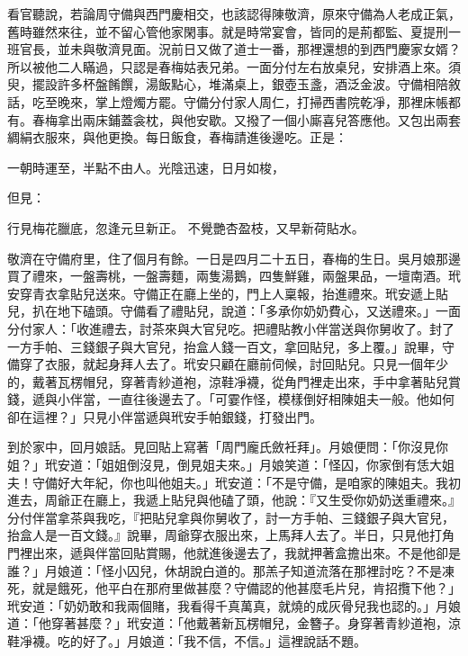 看官聽說，若論周守備與西門慶相交，也該認得陳敬濟，原來守備為人老成正氣，舊時雖然來往，並不留心管他家閑事。就是時常宴會，皆同的是荊都監、夏提刑一班官長，並未與敬濟見面。況前日又做了道士一番，那裡還想的到西門慶家女婿？所以被他二人瞞過，只認是春梅姑表兄弟。一面分付左右放桌兒，安排酒上來。須臾，擺設許多杯盤餚饌，湯飯點心，堆滿桌上，銀壺玉盞，酒泛金波。守備相陪敘話，吃至晚來，掌上燈燭方罷。守備分付家人周仁，打掃西書院乾凈，那裡床帳都有。春梅拿出兩床鋪蓋衾枕，與他安歇。又撥了一個小廝喜兒答應他。又包出兩套綢絹衣服來，與他更換。每日飯食，春梅請進後邊吃。正是：

一朝時運至，半點不由人。光陰迅速，日月如梭，

但見：

行見梅花臘底，忽逢元旦新正。
不覺艷杏盈枝，又早新荷貼水。

敬濟在守備府里，住了個月有餘。一日是四月二十五日，春梅的生日。吳月娘那邊買了禮來，一盤壽桃，一盤壽麵，兩隻湯鵝，四隻鮮雞，兩盤果品，一壇南酒。玳安穿青衣拿貼兒送來。守備正在廳上坐的，門上人稟報，抬進禮來。玳安遞上貼兒，扒在地下磕頭。守備看了禮貼兒，說道：「多承你奶奶費心，又送禮來。」一面分付家人：「收進禮去，討茶來與大官兒吃。把禮貼教小伴當送與你舅收了。封了一方手帕、三錢銀子與大官兒，抬盒人錢一百文，拿回貼兒，多上覆。」說畢，守備穿了衣服，就起身拜人去了。玳安只顧在廳前伺候，討回貼兒。只見一個年少的，戴著瓦楞帽兒，穿著青紗道袍，涼鞋凈襪，從角門裡走出來，手中拿著貼兒賞錢，遞與小伴當，一直往後邊去了。「可霎作怪，模樣倒好相陳姐夫一般。他如何卻在這裡？」只見小伴當遞與玳安手帕銀錢，打發出門。

到於家中，回月娘話。見回貼上寫著「周門龐氏斂衽拜」。月娘便問：「你沒見你姐？」玳安道：「姐姐倒沒見，倒見姐夫來。」月娘笑道：「怪囚，你家倒有恁大姐夫！守備好大年紀，你也叫他姐夫。」玳安道：「不是守備，是咱家的陳姐夫。我初進去，周爺正在廳上，我遞上貼兒與他磕了頭，他說：『又生受你奶奶送重禮來。』分付伴當拿茶與我吃，『把貼兒拿與你舅收了，討一方手帕、三錢銀子與大官兒，抬盒人是一百文錢。』說畢，周爺穿衣服出來，上馬拜人去了。半日，只見他打角門裡出來，遞與伴當回貼賞賜，他就進後邊去了，我就押著盒擔出來。不是他卻是誰？」月娘道：「怪小囚兒，休胡說白道的。那羔子知道流落在那裡討吃？不是凍死，就是餓死，他平白在那府里做甚麼？守備認的他甚麼毛片兒，肯招攬下他？」玳安道：「奶奶敢和我兩個賭，我看得千真萬真，就燒的成灰骨兒我也認的。」月娘道：「他穿著甚麼？」玳安道：「他戴著新瓦楞帽兒，金簪子。身穿著青紗道袍，涼鞋凈襪。吃的好了。」月娘道：「我不信，不信。」這裡說話不題。

